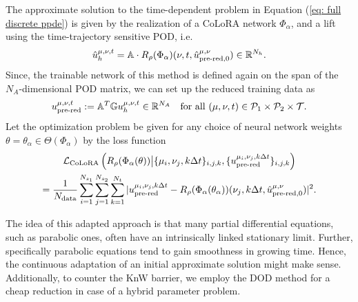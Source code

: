 The approximate solution to the time-dependent problem in Equation (\ref{eq: full discrete ppde}) is given by
the realization of a CoLoRA network $\Phi_\alpha$, and a lift
using the time-trajectory sensitive POD, i.e.
\begin{equation*}
    \hat u_{h}^{\mu, \nu, t} = \mathbb{A} \cdot R_\rho(\Phi_\alpha)(\nu, t, \hat{u}_{\text{pre-red}, 0}^{\mu, \nu}) \in \mathbb{R}^{N_h}.
\end{equation*}
Since, the trainable network of this method is defined again on the span of the $N_A$-dimensional POD
matrix, we can set up the reduced training data as
\begin{equation*}
    u_\text{pre-red}^{\mu, \nu, t} := \mathbb{A}^T \mathbb{G} u_h^{\mu, \nu, t} \in \mathbb{R}^{N_A} \quad \text{for all }(\mu, \nu, t) \in \mathcal{P}_1 \times \mathcal{P}_2 \times \mathcal{T}.
\end{equation*}
Let the optimization problem be given for any choice of
neural network weights $\theta = \theta_\alpha \in \Theta(\Phi_\alpha)$ by the loss function
\begin{multline} \label{eq: loss colora}
    \mathcal{L}_\text{CoLoRA}\left(R_\rho(\Phi_\alpha(\theta)) \big\vert \{\mu_i, \nu_j, k \Delta t\}_{i,j,k}, 
    \{u_{\text{pre-red}}^{\mu_i, \nu_j, k \Delta t} \}_{i,j,k}\right) \\
    = \frac{1}{N_\text{data}}\sum_{i=1}^{N_{s_1}} \sum_{j=1}^{N_{s_2}} 
    \sum_{k = 1}^{N_t} \, \lvert u_{\text{pre-red}}^{\mu_i, \nu_j, k \Delta t} - 
    R_\rho(\Phi_\alpha(\theta_\alpha))(\nu_j, k \Delta t, \hat{u}_{\text{pre-red}, 0}^{\mu, \nu}) \rvert^2.
\end{multline}


\begin{remark}
    The idea of this adapted approach is that many partial differential equations, such as parabolic ones, 
    often have an intrinsically linked stationary limit. Further, specifically parabolic equations tend to gain smoothness
    in growing time. Hence, the continuous adaptation of an initial approximate solution might make sense.
    Additionally, to counter the KnW barrier, we employ the DOD method for a cheap reduction in case of a hybrid parameter
    problem.
\end{remark}